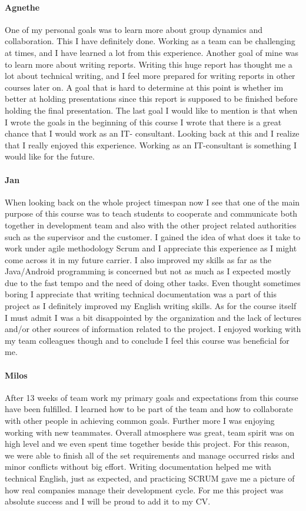 \paragraph{Agnethe}
One of my personal goals was to learn more about group dynamics and collaboration. This I have definitely done. Working as a team can be challenging at times, and I have learned a lot from this experience. Another goal of mine was to learn more about writing reports. Writing this huge report has thought me a lot about technical writing, and I feel more prepared for writing reports in other courses later on. A goal that is hard to determine at this point is whether im better at holding presentations since this report is supposed to be finished before holding the final presentation. The last goal I would like to mention is that when I wrote the goals in the beginning of this course I wrote that  there is a great chance that I would work as an IT- consultant. Looking back at this and I realize that I really enjoyed this experience. Working as an IT-consultant is something I would like for the future. 

\paragraph{Jan}
When looking back on the whole project timespan now I see that one of the main purpose of this course was to teach students to cooperate and communicate both together in development team and also with the other project related authorities such as the supervisor and the customer. I gained the idea of what does it take to work under agile methodology Scrum and I appreciate this experience as I might come across it in my future carrier. I also improved my skills as far as the Java/Android programming is concerned but not as much as I expected mostly due to the fast tempo and the need of doing other tasks. Even thought sometimes boring I appreciate that writing technical documentation was a part of this project as I definitely improved my English writing skills. As for the course itself I must admit I was a bit disappointed by the organization and the lack of lectures and/or other sources of information related to the project. I enjoyed working with my team colleagues though and to conclude I feel this course was beneficial for me.

\paragraph{Milos}
After 13 weeks of team work my primary goals and expectations from this course have been fulfilled. I learned how to be part of the team and how to collaborate with other people in achieving common goals. Further more I was enjoying working with new teammates. Overall atmosphere was great, team spirit was on high level and we even spent time together beside this project. For this reason, we were able to finish all of the set requirements and manage occurred risks and minor conflicts without big effort. Writing documentation helped me with technical English, just as expected, and practicing SCRUM gave me a picture of how real companies manage their development cycle. For me this project was absolute success and I will be proud to add it to my CV.

